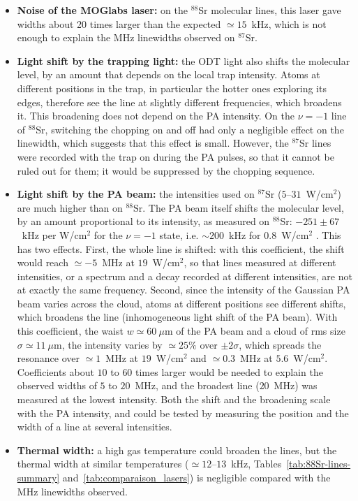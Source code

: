 \begin{itemize}
        The chopping sequence was only used for one $^{88}$Sr spectrum (the $\nu=-1$ line, Sec.~\ref{sec:88Sr_results}), where a comparison with and without chopping showed only a negligible effect on the linewidth. It was not used for the $^{87}$Sr measurements: this possibility therefore cannot be ruled out for $^{87}$Sr.
    \item \textbf{Noise of the MOGlabs laser:} on the $^{88}$Sr molecular lines, this laser gave widths about 20 times larger than the expected $\simeq15$~kHz, which is not enough to explain the MHz linewidths observed on $^{87}$Sr.
    \item \textbf{Light shift by the trapping light:} the ODT light also shifts the molecular level, by an amount that depends on the local trap intensity. Atoms at different positions in the trap, in particular the hotter ones exploring its edges, therefore see the line at slightly different frequencies, which broadens it. This broadening does not depend on the PA intensity. On the $\nu=-1$ line of $^{88}$Sr, switching the chopping on and off had only a negligible effect on the linewidth, which suggests that this effect is small. However, the $^{87}$Sr lines were recorded with the trap on during the PA pulses, so that it cannot be ruled out for them; it would be suppressed by the chopping sequence.
    \item \textbf{Light shift by the PA beam:} the intensities used on $^{87}\text{Sr}$ ($5$--$31$~W/cm$^2$) are much higher than on $^{88}\text{Sr}$. The PA beam itself shifts the molecular level, by an amount proportional to its intensity, as measured on $^{88}$Sr: $-251\pm67$~kHz per W/cm$^2$ for the $\nu=-1$ state, i.e. $\sim 200$~kHz for $0.8$~W/cm$^2$ \cite{blatt_measurement_2011}. This has two effects. First, the whole line is shifted: with this coefficient, the shift would reach $\simeq-5$~MHz at $19$~W/cm$^2$, so that lines measured at different intensities, or a spectrum and a decay recorded at different intensities, are not at exactly the same frequency. Second, since the intensity of the Gaussian PA beam varies across the cloud, atoms at different positions see different shifts, which broadens the line (inhomogeneous light shift of the PA beam). With this coefficient, the waist $w\simeq60~\mu$m of the PA beam and a cloud of rms size $\sigma\simeq11~\mu$m, the intensity varies by $\simeq25\%$ over $\pm2\sigma$, which spreads the resonance over $\simeq1$~MHz at $19$~W/cm$^2$ and $\simeq0.3$~MHz at $5.6$~W/cm$^2$. Coefficients about $10$ to $60$ times larger would be needed to explain the observed widths of $5$ to $20$~MHz, and the broadest line ($20$~MHz) was measured at the lowest intensity. Both the shift and the broadening scale with the PA intensity, and could be tested by measuring the position and the width of a line at several intensities.
    \item \textbf{Thermal width:} a high gas temperature could broaden the lines, but the thermal width at similar temperatures ($\simeq12$--$13$~kHz, Tables~\ref{tab:88Sr-lines-summary} and~\ref{tab:comparaison_lasers}) is negligible compared
    with the MHz linewidths observed.
\end{itemize}

